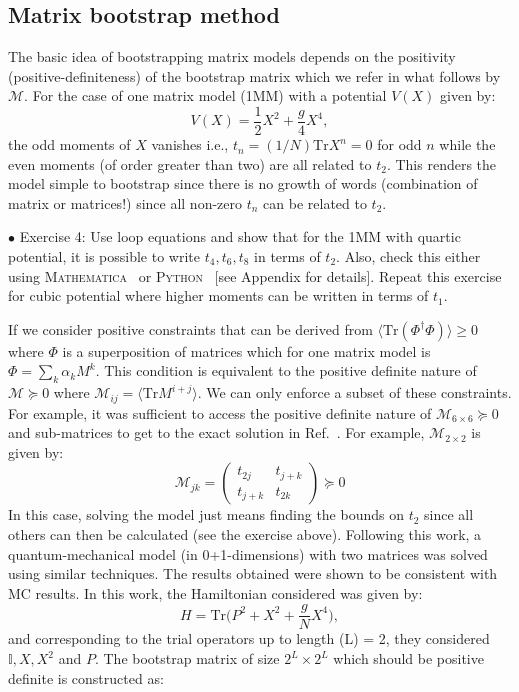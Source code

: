 \documentclass[letter,11pt]{article}
\newcommand{\MA}{\textsc{Mathematica}}
\newcommand{\PY}{\textsc{Python}}
\begin{document}
\subsection{Matrix bootstrap method}
The basic idea of bootstrapping matrix models depends on the 
positivity (positive-definiteness) of the bootstrap matrix which we refer in what follows 
by $\mathcal{M}$. For the case of one matrix model (1MM) with a potential $V(X)$ given by: 
\begin{equation}
    V(X) = \frac12 X^2 + \frac{g}{4} X^4, 
\end{equation}
the odd moments of $X$ vanishes i.e., $ t_{n} = (1/N)\mbox{Tr} X^n = 0$ for odd $n$
while the even moments (of order greater than two) are all related to $t_{2}$. This renders the 
model simple to bootstrap since there is no growth of words (combination of matrix or matrices!)
since all non-zero $t_{n}$ can be related to $t_{2}$. 
\begin{mdframed}[backgroundcolor=blue!3] 
	\textsc{} 
	$\bullet$ Exercise 4: Use loop equations and show that for the 1MM with quartic potential, it is possible to write $t_{4}, t_{6}, t_{8}$ in terms of $t_{2}$. Also, check this either using \MA~ or \PY~ [see Appendix for details]. 
Repeat this exercise for cubic potential where higher moments can be written in terms of $t_1$.  
\end{mdframed} 
If we consider positive constraints that can be derived from $\langle \mbox{Tr}(\Phi^{\dagger}\Phi) \rangle \ge 0 $
where $\Phi$ is a superposition of matrices which for one matrix model is 
$ \Phi = \sum_{k} \alpha_{k} M^{k}$. This condition is equivalent to the positive definite nature of
$\mathcal{M} \succeq 0 $ where $ \mathcal{M}_{ij} = \langle \mbox{Tr} M^{i+j} \rangle$. 
We can only enforce a subset of these constraints. For example, it was sufficient to 
access the positive definite nature of $\mathcal{M}_{6 \times 6} \succeq 0 $ 
and sub-matrices to get to the exact solution in Ref.~\cite{Lin:2020mme}. 
For example, $\mathcal{M}_{2 \times 2}$ is given by:
\begin{equation}
	\mathcal{M}_{jk} = 
	\begin{pmatrix}
		t_{2j} & t_{j+k}  \\
		t_{j+k} & t_{2k}  
	\end{pmatrix}  \succeq 0
\end{equation}
In this case, solving the model just means finding the bounds on $t_{2}$ 
since all others can then be calculated (see the exercise above). 
Following this work, a quantum-mechanical 
model (in 0+1-dimensions) with two matrices was solved using similar techniques. 
The results obtained were shown to be consistent with MC results. 
In this work, the Hamiltonian considered was given by:
\begin{equation}
H = \mbox{Tr} \Big( P^2 + X^2 + \frac{g}{N} X^4 \Big),
\end{equation}
and corresponding to the trial operators up to length (L) = 2, 
they considered $ \mathbb{I}, X, X^{2}$ and $P$. The bootstrap matrix
of size $2^L \times 2^L$ which should be positive definite is constructed as:
\end{document}
